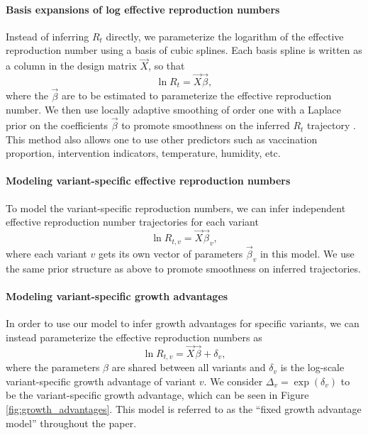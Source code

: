 \paragraph{Basis expansions of log effective reproduction numbers}%

Instead of inferring $R_{t}$ directly, we parameterize the logarithm of the effective reproduction number using a basis of cubic splines.
Each basis spline is written as a column in the design matrix $\vec{X}$, so that
\begin{equation}
  \ln R_{t} = \vec{X} \vec{\beta},
\end{equation}
where the $\vec{\beta}$ are to be estimated to parameterize the effective reproduction number.
We then use locally adaptive smoothing of order one with a Laplace prior on the coefficients $\vec{\beta}$ to promote smoothness on the inferred $R_t$ trajectory \cite{Faulkner2018}.
This method also allows one to use other predictors such as vaccination proportion, intervention indicators, temperature, humidity, etc.



\paragraph{Modeling variant-specific effective reproduction numbers}%

To model the variant-specific reproduction numbers, we can infer independent effective reproduction number trajectories for each variant
\begin{equation}
  \ln R_{t, v} = \vec{X} \vec{\beta}_{v},
\end{equation}
where each variant $v$ gets its own vector of parameters $\vec{\beta}_{v}$ in this model.
We use the same prior structure as above to promote smoothness on inferred trajectories.

\paragraph{Modeling variant-specific growth advantages}%

In order to use our model to infer growth advantages for specific variants, we can instead parameterize the effective reproduction numbers as
\begin{equation}
\ln R_{t,v} = \vec{X} \vec{\beta} + \delta_{v},
\end{equation}
where the parameters $\beta$ are shared between all variants and $\delta_{v}$ is the log-scale variant-specific growth advantage of variant $v$.
We consider $\Delta_{v} = \exp(\delta_{v})$ to be the variant-specific growth advantage, which can be seen in Figure \ref{fig:growth_advantages}.
This model is referred to as the ``fixed growth advantage model'' throughout the paper.

